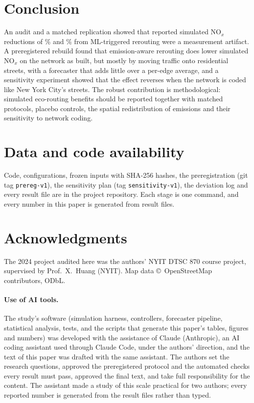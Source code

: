 \documentclass[11pt]{article}
\begin{document}
\section{Conclusion}\label{sec:conclusion}
An audit and a matched replication showed that reported simulated NO$_x$ reductions of \LegacyNOxDropRF\% and
\LegacyNOxDropXGB\% from ML-triggered rerouting were a measurement artifact. A preregistered rebuild found that emission-aware rerouting does lower
simulated NO$_x$ on the network as built, but mostly by moving traffic onto residential streets, with a forecaster
that adds little over a per-edge average, and a sensitivity experiment showed that the effect reverses when the
network is coded like New York City's streets. The robust contribution is methodological: simulated eco-routing
benefits should be reported together with matched protocols, placebo controls, the spatial redistribution of
emissions and their sensitivity to network coding.

\section*{Data and code availability}
Code, configurations, frozen inputs with SHA-256 hashes, the preregistration (git tag \texttt{prereg-v1}), the
sensitivity plan (tag \texttt{sensitivity-v1}), the deviation log and every result file are in the project
repository. Each stage is one command, and every number in this paper is generated from result files.

\section*{Acknowledgments}
The 2024 project audited here was the authors' NYIT DTSC 870 course project, supervised by Prof.\ X.\ Huang
(NYIT). Map data \copyright\ OpenStreetMap contributors, ODbL.

\paragraph{Use of AI tools.} The study's software (simulation harness, controllers, forecaster pipeline, statistical
analysis, tests, and the scripts that generate this paper's tables, figures and numbers) was developed with the
assistance of Claude (Anthropic), an AI coding assistant used through Claude Code, under the authors' direction, and
the text of this paper was drafted with the same assistant. The authors set the research questions, approved the
preregistered protocol and the automated checks every result must pass, approved the final text, and take full
responsibility for the content. The assistant made a study of this scale practical for two authors; every reported
number is generated from the result files rather than typed.
\end{document}
